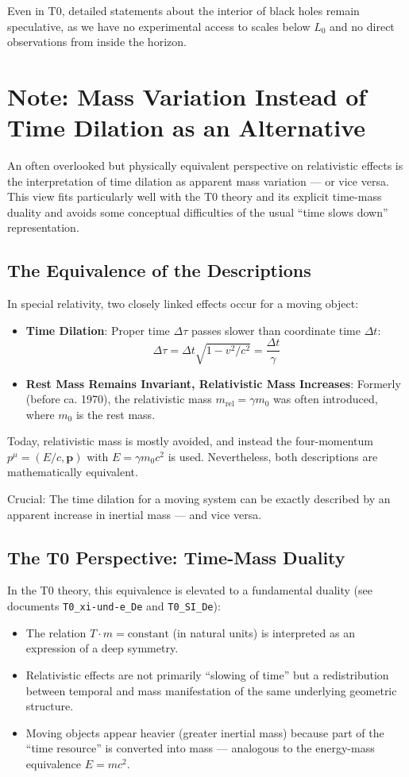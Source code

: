 	Even in T0, detailed statements about the interior of black holes remain speculative, as we have no experimental access to scales below $L_0$ and no direct observations from inside the horizon.
	
	\section{Note: Mass Variation Instead of Time Dilation as an Alternative}
	An often overlooked but physically equivalent perspective on relativistic effects is the interpretation of time dilation as apparent mass variation --- or vice versa. This view fits particularly well with the T0 theory and its explicit time-mass duality and avoids some conceptual difficulties of the usual ``time slows down'' representation.
	
	\subsection{The Equivalence of the Descriptions}
	In special relativity, two closely linked effects occur for a moving object:
	\begin{itemize}
		\item \textbf{Time Dilation}: Proper time $\Delta \tau$ passes slower than coordinate time $\Delta t$:
		\[
		\Delta \tau = \Delta t \sqrt{1 - v^2/c^2} = \frac{\Delta t}{\gamma}
		\]
		\item \textbf{Rest Mass Remains Invariant, Relativistic Mass Increases}: Formerly (before ca. 1970), the relativistic mass
		$m_{\text{rel}} = \gamma m_0$
		was often introduced, where $m_0$ is the rest mass.
	\end{itemize}
	
	Today, relativistic mass is mostly avoided, and instead the four-momentum $p^\mu = (E/c, \mathbf{p})$ with $E = \gamma m_0 c^2$ is used. Nevertheless, both descriptions are mathematically equivalent.
	
	Crucial: The time dilation for a moving system can be exactly described by an apparent increase in inertial mass --- and vice versa.
	
	\subsection{The T0 Perspective: Time-Mass Duality}
	In the T0 theory, this equivalence is elevated to a fundamental duality (see documents \texttt{T0\_xi-und-e\_De} and \texttt{T0\_SI\_De}):
	\begin{itemize}
		\item The relation $T \cdot m = \text{constant}$ (in natural units) is interpreted as an expression of a deep symmetry.
		\item Relativistic effects are not primarily ``slowing of time'' but a redistribution between temporal and mass manifestation of the same underlying geometric structure.
		\item Moving objects appear heavier (greater inertial mass) because part of the ``time resource'' is converted into mass --- analogous to the energy-mass equivalence $E = mc^2$.
	\end{itemize}
	
